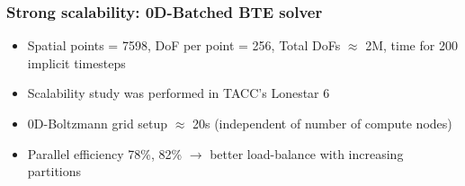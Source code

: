 \documentclass[mathserif, aspectratio=169]{beamer}
\begin{document}
\begin{frame}[fragile]
	\frametitle{Strong scalability: 0D-Batched BTE solver}
	\begin{itemize}
		\item Spatial points = 7598, DoF per point = 256, Total DoFs $\approx$ 2M, time for 200 implicit timesteps
		\item Scalability study was performed in TACC's Lonestar 6 %
	\end{itemize}
	\begin{figure}
		\centering
	\end{figure}
	\begin{itemize}
		\item 0D-Boltzmann grid setup $\approx$ 20s (independent of number of compute nodes)
		\item Parallel efficiency 78\%, 82\% $\rightarrow$ better load-balance with increasing partitions
	\end{itemize}
\end{frame}
\end{document}

